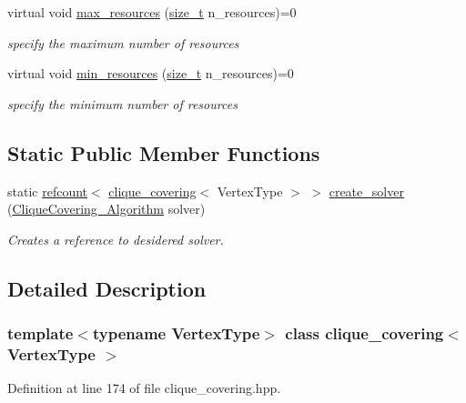 \begin{DoxyCompactItemize}
virtual void \hyperlink{classclique__covering_a4bdfaa7dece2c8c97f09a2a1a4827cb4}{max\+\_\+resources} (\hyperlink{tutorial__fpt__2017_2intro_2sixth_2test_8c_a7c94ea6f8948649f8d181ae55911eeaf}{size\+\_\+t} n\+\_\+resources)=0
\begin{DoxyCompactList}\small\item\em specify the maximum number of resources \end{DoxyCompactList}\item 
virtual void \hyperlink{classclique__covering_a031948f90f5b05911a91b85c578fc9ca}{min\+\_\+resources} (\hyperlink{tutorial__fpt__2017_2intro_2sixth_2test_8c_a7c94ea6f8948649f8d181ae55911eeaf}{size\+\_\+t} n\+\_\+resources)=0
\begin{DoxyCompactList}\small\item\em specify the minimum number of resources \end{DoxyCompactList}\end{DoxyCompactItemize}
\subsection*{Static Public Member Functions}
\begin{DoxyCompactItemize}
\item 
static \hyperlink{structrefcount}{refcount}$<$ \hyperlink{classclique__covering}{clique\+\_\+covering}$<$ Vertex\+Type $>$ $>$ \hyperlink{classclique__covering_a6527a9e4fa54206327d9fad4194b9acf}{create\+\_\+solver} (\hyperlink{clique__covering_8hpp_acc23ade19dac4d6935b7792353e207d9}{Clique\+Covering\+\_\+\+Algorithm} solver)
\begin{DoxyCompactList}\small\item\em Creates a reference to desidered solver. \end{DoxyCompactList}\end{DoxyCompactItemize}


\subsection{Detailed Description}
\subsubsection*{template$<$typename Vertex\+Type$>$\newline
class clique\+\_\+covering$<$ Vertex\+Type $>$}



Definition at line 174 of file clique\+\_\+covering.\+hpp.



